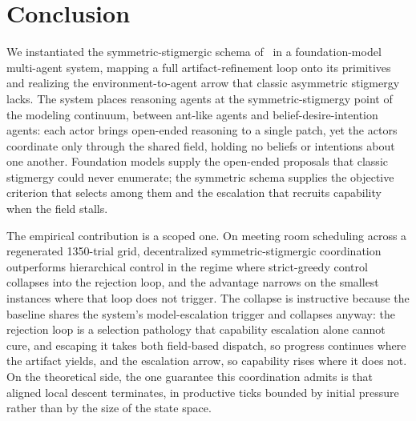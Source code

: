 
\section{Conclusion}

We instantiated the symmetric-stigmergic schema of~\cite{parunak2025insects} in a foundation-model multi-agent system, mapping a full artifact-refinement loop onto its primitives and realizing the environment-to-agent arrow that classic asymmetric stigmergy lacks. The system places reasoning agents at the symmetric-stigmergy point of the modeling continuum, between ant-like agents and belief-desire-intention agents: each actor brings open-ended reasoning to a single patch, yet the actors coordinate only through the shared field, holding no beliefs or intentions about one another. Foundation models supply the open-ended proposals that classic stigmergy could never enumerate; the symmetric schema supplies the objective criterion that selects among them and the escalation that recruits capability when the field stalls.

The empirical contribution is a scoped one. On meeting room scheduling across a regenerated 1350-trial grid, decentralized symmetric-stigmergic coordination outperforms hierarchical control in the regime where strict-greedy control collapses into the rejection loop, and the advantage narrows on the smallest instances where that loop does not trigger. The collapse is instructive because the baseline shares the system's model-escalation trigger and collapses anyway: the rejection loop is a selection pathology that capability escalation alone cannot cure, and escaping it takes both field-based dispatch, so progress continues where the artifact yields, and the escalation arrow, so capability rises where it does not. On the theoretical side, the one guarantee this coordination admits is that aligned local descent terminates, in productive ticks bounded by initial pressure rather than by the size of the state space.
